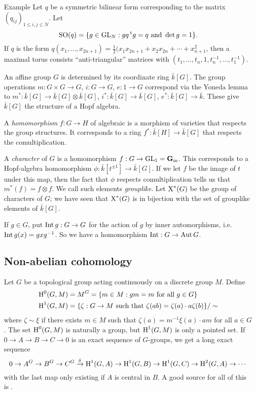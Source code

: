 \begin{enonce}[remark]{Example}
Let $q$ be a symmetric bilinear form corresponding to the matrix 
$(q_{i j})_{1\leqslant i,j\leqslant N}$. Let 
\[
  \operatorname{SO}(q) = \{g\in \operatorname{GL}_N: g q \prescript{\mathrm{t}}{}{g} = q\text{ and }\det g=1\} .
\]
If $q$ is the form 
$q(x_1,\dots,x_{2n+1}) = \frac 1 2 (x_1 x_{2n+1} + x_2 x_{2n} + \cdots + x_{n+1}^2$, 
then a maximal torus consists ``anti-triangular'' matrices with 
$(t_1,\dots,t_n,1,t_n^{-1},\dots,t_1^{-1})$. 
\end{enonce}

An affine group $G$ is determined by its coordinate ring $\bar k[G]$. The 
group operations $m:G\times G\to G$, $i:G\to G$, $e:1\to G$ correspond via 
the Yoneda lemma to $m^\ast:\bar k[G]\to \bar k[G]\otimes \bar k[G]$, 
$i^\ast:\bar k[G] \to \bar k[G]$, $e^\ast:\bar k[G] \to \bar k$. These give 
$\bar k[G]$ the structure of a Hopf algebra. 

A \emph{homomorphism} $f:G\to H$ of algebraic is a morphism of varieties that 
respects the group structures. It corresponds to a ring 
$f^\ast:\bar k[H] \to \bar k[G]$ that respects the comultiplication.

A \emph{character} of $G$ is a homomorphism 
$f:G\to \operatorname{GL}_1 = \mathbf{G}_{\mathrm{m}}$. This corresponds to a 
Hopf-algebra homomorphism $\phi:\bar k[t^{\pm 1}] \to \bar k[G]$. If we let $f$ 
be the image of $t$ under this map, then the fact that $\phi$ respects 
comultiplication tells us that $m^\ast(f) = f\otimes f$. We call such 
elements \emph{grouplike}. Let $\operatorname{X}^\ast(G)$ be the group of characters 
of $G$; we have seen that $\operatorname{X}^\ast(G)$ is in bijection with the set 
of grouplike elements of $\bar k[G]$. 

If $g\in G$, put $\operatorname{Int} g:G\to G$ for the action of $g$ by inner 
automorphisms, i.e.\ $\operatorname{Int} g(x) = g x g^{-1}$. So we have a homomorphism 
$\operatorname{Int}:G\to \operatorname{Aut} G$. 





\subsection{Non-abelian cohomology}

Let $G$ be a topological group acting continuously on a discrete group $M$. 
Define 
\begin{align*}
  \operatorname{H}^0(G,M) &= M^G = \{m\in M:g m=m\text{ for all }g\in G\} \\
  \operatorname{H}^1(G,M) &= \{\zeta:G\to M\text{ such that }\zeta(a b) = \zeta(a)\cdot a \zeta(b)\} / \sim 
\end{align*}
where $\zeta\sim \xi$ if there exists $m\in M$ such that 
$\zeta(a) = m^{-1} \xi(a) \cdot a m$ for all $a\in G$. The set $\operatorname{H}^0(G,M)$ is 
naturally a group, but $\operatorname{H}^1(G,M)$ is only a pointed set. If 
$0 \to A \to B \to C \to 0$ is an exact sequence of $G$-groups, we get a long 
exact sequence 
\[
  0 \to A^G \to B^G \to C^G \xrightarrow\delta \operatorname{H}^1(G,A) \to \operatorname{H}^1(G,B) \to \operatorname{H}^1(G,C) \to \operatorname{H}^2(G,A) \to \cdots 
\]
with the last map only existing if $A$ is central in $B$. A good source for all 
of this is \cite{s79}. 

